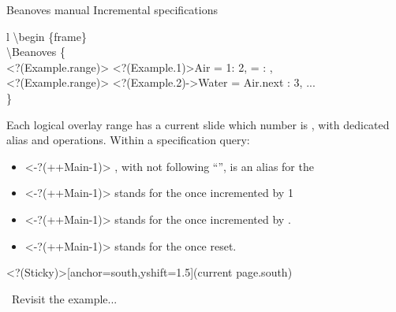 \documentclass{beamer}
\begin{document}
\begin{frame}
{Beanoves manual}
{\large Incremental specifications}
\begin{myCodeBox}{l}%
\backslash begin \{frame\}\\
\backslash Beanoves \{\\
\phantom{xx}%
\alt<?(Example.range)>{%
  {\only<?(Example.1)>{\color{MyGreen}}Air \phantom{xx}= 1\phantom{xxxxxxxx}: 2,}
}{%
   =  : ,
}\\
\alt<?(Example.range)>{%
\phantom{xx}%
{\only<?(Example.2)->{\color{MyGreen}}Water = Air.next : 3,}
}{%
\phantom{xx}...
}\\
\}
\end{myCodeBox}
Each logical overlay range has a current slide which number is , with dedicated alias and operations.
Within a specification query:
\begin{itemize}
\item
\only<-?(++Main-1)>{}%
, with not following ``'', is an alias for the 
\item
\only<-?(++Main-1)>{}%
 stands for the  once incremented by 1
\item
\only<-?(++Main-1)>{}%
 stands for the  once incremented by .
\item
\only<-?(++Main-1)>{}%
 stands for the  once reset.
\end{itemize}
%
\BeanovesSticky<?(Sticky)>[anchor=south,yshift=1.5\baselineskip](current page.south){\bfseries%
\begin{minipage}{0.5\textwidth}
\myWatch\ Revisit the example...
\end{minipage}
}%
\vspace{2\baselineskip}
%
\end{frame}


\end{document}

